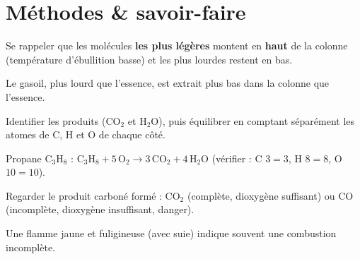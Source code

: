\section{Méthodes \& savoir-faire}

Se rappeler que les molécules \textbf{les plus légères} montent en \textbf{haut} de la
colonne (température d'ébullition basse) et les plus lourdes restent en bas.
\begin{exemple}
Le gasoil, plus lourd que l'essence, est extrait plus bas dans la colonne que l'essence.
\end{exemple}

Identifier les produits ($\mathrm{CO_2}$ et $\mathrm{H_2O}$), puis équilibrer en comptant
séparément les atomes de C, H et O de chaque côté.
\begin{exemple}
Propane $\mathrm{C_3H_8}$ : $\mathrm{C_3H_8+5\,O_2\longrightarrow3\,CO_2+4\,H_2O}$
(vérifier : C $3=3$, H $8=8$, O $10=10$).
\end{exemple}

Regarder le produit carboné formé : $\mathrm{CO_2}$ (complète, dioxygène suffisant) ou CO
(incomplète, dioxygène insuffisant, danger).
\begin{exemple}
Une flamme jaune et fuligineuse (avec suie) indique souvent une combustion incomplète.
\end{exemple}


